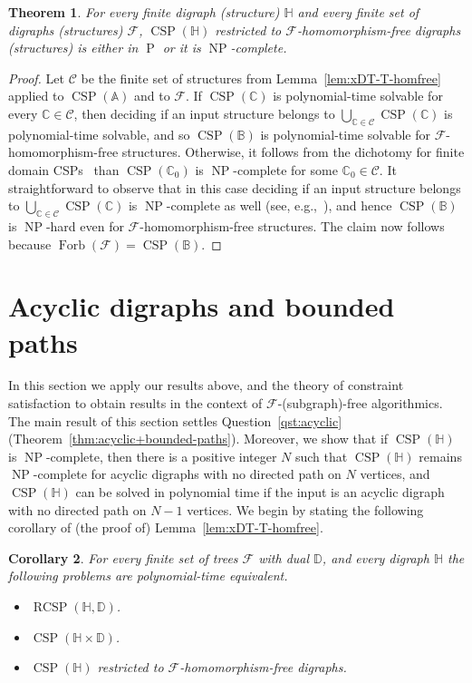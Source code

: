 \documentclass{article}
\newtheorem{theorem}{Theorem}
\newtheorem{corollary}[theorem]{Corollary}
\theoremstyle{definition}
\theoremstyle{remark}
\DeclareMathOperator{\NP}{NP}
\DeclareMathOperator{\cP}{P}
\DeclareMathOperator{\Forb}{Forb}
\DeclareMathOperator{\CSP}{CSP}
\DeclareMathOperator{\RCSP}{RCSP}
\newcommand{\bA}{{\mathbb A}}
\newcommand{\bB}{{\mathbb B}}
\newcommand{\bC}{{\mathbb C}}
\newcommand{\bD}{{\mathbb D}}
\newcommand{\bH}{{\mathbb H}}
\newcommand{\calC}{{\mathcal C}}
\newcommand{\calF}{{\mathcal F}}
\begin{document}
\begin{theorem}\label{thm:FO-restructions-complexity-dichotomy}
    For every finite digraph (structure) $\bH$ and every finite set of digraphs (structures)
    $\calF$, $\CSP(\bH)$ restricted to $\calF$-homomorphism-free digraphs (structures) 
    is either in $\cP$ or it is  $\NP$-complete.
\end{theorem}
\begin{proof}
    Let $\calC$ be the finite set of structures from Lemma~\ref{lem:xDT-T-homfree}
    applied to $\CSP(\bA)$ and to $\calF$.
    If $\CSP(\bC)$ is polynomial-time solvable for every $\bC\in\calC$,
    then deciding if an input structure belongs to $\bigcup_{\bC\in \calC}\CSP(\bC)$
    is polynomial-time solvable, and so $\CSP(\bB)$ is polynomial-time solvable
    for $\calF$-homomorphism-free structures.
    Otherwise, it follows from the dichotomy for finite domain CSPs~\cite{BulatovFVConjecture,Zhuk20}
    than $\CSP(\bC_0)$ is $\NP$-complete for some $\bC_0\in \calC$. It straightforward to observe
    that in this case deciding if an input structure belongs to $\bigcup_{\bC\in \calC}\CSP(\bC)$ is
    $\NP$-complete as well (see, e.g.,~\cite[Theorem 25]{FoniokNesetril}), 
    and hence $\CSP(\bB)$ is $\NP$-hard even for $\calF$-homomorphism-free structures.
    The claim now follows because $\Forb(\calF) = \CSP(\bB)$.
\end{proof}




\section{Acyclic digraphs and bounded paths}
\label{sect:acyclic}



In this section we apply our results above, and the theory of constraint satisfaction to
obtain results in the context of $\calF$-(subgraph)-free algorithmics. 
The main result of this section settles Question~\ref{qst:acyclic}
(Theorem~\ref{thm:acyclic+bounded-paths}). Moreover, we show that 
if $\CSP(\bH)$ is $\NP$-complete, then there is a positive integer $N$ such that
$\CSP(\bH)$ remains $\NP$-complete for acyclic digraphs with no directed path on
$N$ vertices, and $\CSP(\bH)$ can be solved in polynomial time if the input is an
acyclic digraph with no directed path on $N-1$ vertices.
We begin by stating the following corollary of (the proof of) Lemma~\ref{lem:xDT-T-homfree}.

\begin{corollary}\label{cor:trees-hom-free}
    For every finite set of trees $\calF$ with dual $\bD$, and every digraph $\bH$ the following 
    problems are polynomial-time equivalent.
    \begin{itemize}
        \item $\RCSP(\bH,\bD)$.
        \item $\CSP(\bH\times \bD)$.
        \item $\CSP(\bH)$ restricted to $\calF$-homomorphism-free digraphs.
    \end{itemize}
\end{corollary}
\end{document}
